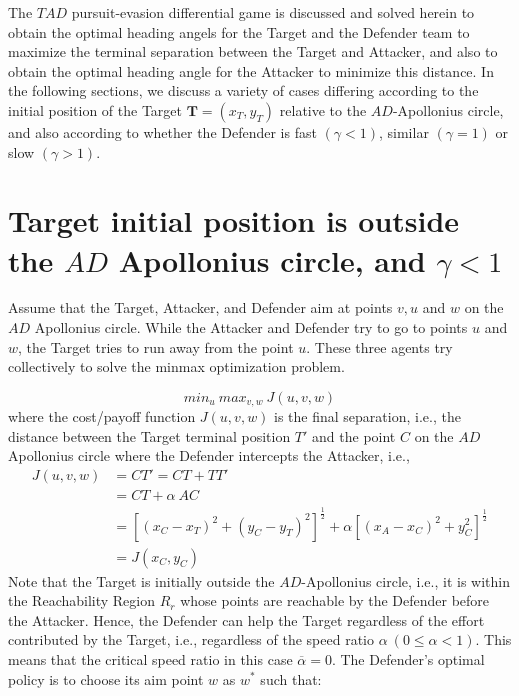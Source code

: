 \label{strategies}


The $TAD$ pursuit-evasion differential game is discussed and solved herein to obtain the optimal heading angels for the Target and the Defender team to maximize the terminal separation between the Target and Attacker, and also to obtain the optimal heading angle for the Attacker to minimize this distance. In the following sections, we discuss a variety of cases differing according to the initial position of the Target $\boldsymbol{T}=(x_T,y_T)$ relative to the $AD$-Apollonius circle, and also according to whether the Defender is fast $(\gamma<1)$, similar $(\gamma=1)$ or slow $(\gamma>1)$.

 
\section{Target initial position is outside the $AD$ Apollonius circle, and $\gamma<1$}

Assume that the Target, Attacker, and Defender aim at points $v, u$ and $w$ on the $AD$ Apollonius circle. While the Attacker and Defender try to go to points $u$ and $w$, the Target tries to run away from the point $u$. These three agents try collectively to solve the minmax optimization problem.

\begin{equation}
min_u\ max_{v,w}\ J(u,v,w)
\label{optimization prob}
\end{equation}  
where the cost/payoff function $J(u,v,w)$ is the final separation, i.e., the distance between the Target terminal position $T'$ and the point $C$ on the $AD$ Apollonius circle where the Defender intercepts the Attacker, i.e., 
\begin{equation}
\begin{split}
J(u,v,w) &= CT' = CT + TT' \\
&= CT +\alpha\ AC \\
&=[(x_C-x_T)^2+(y_C-y_T)^2]^{\frac{1}{2}}+\alpha[(x_A-x_C)^2+y_C^2]^{\frac{1}{2}} \\
&= J(x_C, y_C)
\end{split}
\label{costfn}
\end{equation} 
Note that the Target is initially outside the $AD$-Apollonius circle, i.e., it is within the Reachability Region $R_r$ whose points are reachable by the Defender before the Attacker. Hence, the Defender can help the Target regardless of the effort contributed by the Target, i.e., regardless of the speed ratio $\alpha\ (0\leq \alpha<1)$. This means that the critical speed ratio in this case $\overline{\alpha}=0$. The Defender's optimal policy is to choose its aim point $w$ as $w^*$ such that:

